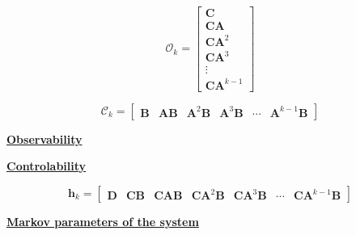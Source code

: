 \documentclass[aspectratio=169, usenames, dvipsnames]{beamer}
\begin{document}
\begin{frame}%
  \vfill

  \begin{minipage}{.28\textwidth}
    \Large

    \[
    \mathcal{O}_k
    =
    \begin{bmatrix}
      \bm{C} \\ \bm{CA} \\ \bm{CA}^2 \\ \bm{CA}^3 \\ \vdots \\ \bm{CA}^{k-1}
    \end{bmatrix}
    \]
  \end{minipage}%
  \hfill
  \begin{minipage}{.68\textwidth}
    \Large

    \[
    \mathcal{C}_k
    =
    \begin{bmatrix}
      \bm{B} & \bm{AB} & \bm{A}^2 \bm{B} & \bm{A}^3 \bm{B} & \cdots & \bm{A}^{k-1} \bm{B}
    \end{bmatrix}
    \]
  \end{minipage}

  \vfill

  \begin{minipage}{.28\textwidth}
    \centering
    \underline{\textbf{Observability}}
  \end{minipage}%
  \hfill
  \begin{minipage}{.68\textwidth}
    \centering
    \underline{\textbf{Controlability}}
  \end{minipage}

  \vfill
\end{frame}

\begin{frame}
  \centering
  \vfill

  {\Large
  \[
    \bm{h}_k
    =
    \begin{bmatrix}
      \bm{D} & \bm{CB} & \bm{CAB} & \bm{CA}^2\bm{B} & \bm{CA}^3 \bm{B} & \cdots & \bm{CA}^{k-1} \bm{B}
    \end{bmatrix}
  \]
  }

  \bigskip

  \underline{\textbf{Markov parameters of the system}}

  \vfill
\end{frame}
\end{document}
